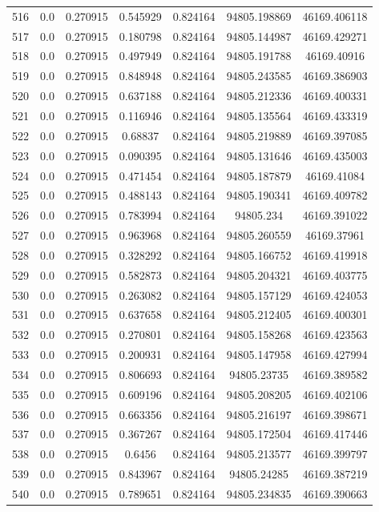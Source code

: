 \begin{table}
\begin{tabular*}{\linewidth}{c|c|c|c|c|c|c}
516 & 0.0 & 0.270915 & 0.545929 & 0.824164 & 94805.198869 & 46169.406118\\
517 & 0.0 & 0.270915 & 0.180798 & 0.824164 & 94805.144987 & 46169.429271\\
518 & 0.0 & 0.270915 & 0.497949 & 0.824164 & 94805.191788 & 46169.40916\\
519 & 0.0 & 0.270915 & 0.848948 & 0.824164 & 94805.243585 & 46169.386903\\
520 & 0.0 & 0.270915 & 0.637188 & 0.824164 & 94805.212336 & 46169.400331\\
521 & 0.0 & 0.270915 & 0.116946 & 0.824164 & 94805.135564 & 46169.433319\\
522 & 0.0 & 0.270915 & 0.68837 & 0.824164 & 94805.219889 & 46169.397085\\
523 & 0.0 & 0.270915 & 0.090395 & 0.824164 & 94805.131646 & 46169.435003\\
524 & 0.0 & 0.270915 & 0.471454 & 0.824164 & 94805.187879 & 46169.41084\\
525 & 0.0 & 0.270915 & 0.488143 & 0.824164 & 94805.190341 & 46169.409782\\
526 & 0.0 & 0.270915 & 0.783994 & 0.824164 & 94805.234 & 46169.391022\\
527 & 0.0 & 0.270915 & 0.963968 & 0.824164 & 94805.260559 & 46169.37961\\
528 & 0.0 & 0.270915 & 0.328292 & 0.824164 & 94805.166752 & 46169.419918\\
529 & 0.0 & 0.270915 & 0.582873 & 0.824164 & 94805.204321 & 46169.403775\\
530 & 0.0 & 0.270915 & 0.263082 & 0.824164 & 94805.157129 & 46169.424053\\
531 & 0.0 & 0.270915 & 0.637658 & 0.824164 & 94805.212405 & 46169.400301\\
532 & 0.0 & 0.270915 & 0.270801 & 0.824164 & 94805.158268 & 46169.423563\\
533 & 0.0 & 0.270915 & 0.200931 & 0.824164 & 94805.147958 & 46169.427994\\
534 & 0.0 & 0.270915 & 0.806693 & 0.824164 & 94805.23735 & 46169.389582\\
535 & 0.0 & 0.270915 & 0.609196 & 0.824164 & 94805.208205 & 46169.402106\\
536 & 0.0 & 0.270915 & 0.663356 & 0.824164 & 94805.216197 & 46169.398671\\
537 & 0.0 & 0.270915 & 0.367267 & 0.824164 & 94805.172504 & 46169.417446\\
538 & 0.0 & 0.270915 & 0.6456 & 0.824164 & 94805.213577 & 46169.399797\\
539 & 0.0 & 0.270915 & 0.843967 & 0.824164 & 94805.24285 & 46169.387219\\
540 & 0.0 & 0.270915 & 0.789651 & 0.824164 & 94805.234835 & 46169.390663\\
\end{tabular*}
\end{table}
